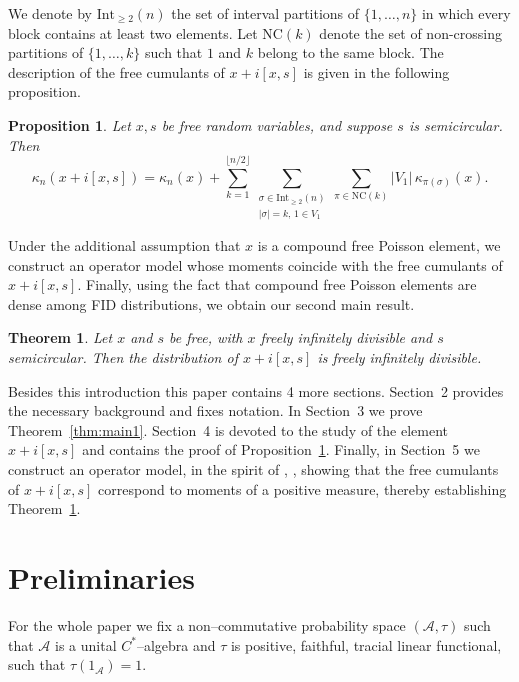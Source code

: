 \documentclass{amsart}
\newtheorem{thm}[claim]{Theorem}
\newtheorem{prop}[claim]{Proposition}
\newcommand{\cA}{\mathcal{A}}
\begin{document}
We denote by \( \mathrm{Int}_{\geq 2}(n) \) the set of interval partitions of \( \{1,\ldots,n\} \) in which every block contains at least two elements.  
Let \( \mathrm{NC}(k) \) denote the set of non-crossing partitions of \( \{1,\ldots,k\} \) such that \( 1 \) and \( k \) belong to the same block.  
The description of the free cumulants of \( x + i[x,s] \) is given in the following proposition.

\begin{prop}\label{prop:intro}
	Let \( x, s \) be free random variables, and suppose \( s \) is semicircular. Then
	\[
	\kappa_n(x+i[x,s])
	=\kappa_n(x)+ \sum_{k=1}^{\lfloor n/2 \rfloor} 
	\sum_{\substack{\sigma \in \mathrm{Int}_{\geq 2}(n) \\ |\sigma|=k,\, 1 \in V_1}}
	\sum_{\pi \in \mathrm{NC}(k)} 
	|V_1|\, \kappa_{\pi(\sigma)}(x).
	\]
\end{prop}

Under the additional assumption that \( x \) is a compound free Poisson element, we construct an operator model whose moments coincide with the free cumulants of \( x + i[x,s] \).  
Finally, using the fact that compound free Poisson elements are dense among FID distributions, we obtain our second main result.

\begin{thm}\label{thm:main2}
	Let \( x \) and \( s \) be free, with \( x \) freely infinitely divisible and \( s \) semicircular. Then the distribution of \( x + i[x,s] \) is freely infinitely divisible.
\end{thm}

Besides this introduction this paper contains 4 more sections.  
Section~2 provides the necessary background and fixes notation.  
In Section~3 we prove Theorem~\ref{thm:main1}.  
Section~4 is devoted to the study of the element \( x + i[x,s] \) and contains the proof of Proposition~\ref{prop:intro}.  
Finally, in Section~5 we construct an operator model, in the spirit of \cite{mvpvv}, \cite{mvp-monot}, showing that the free cumulants of \( x + i[x,s] \) correspond to moments of a positive measure, thereby establishing Theorem~\ref{thm:main2}.


\section{Preliminaries}\label{section:1}


For the whole paper we fix a non--commutative probability space $(\cA,\tau)$ such that $\cA$ is a unital $C^*$--algebra and $\tau$ is positive, faithful, tracial linear functional, such that $\tau(1_{\cA})=1$.
\end{document}
